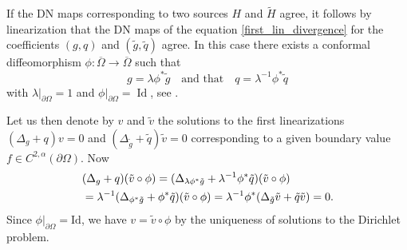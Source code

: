 \documentclass[a4paper, 10pt, twoside, notitlepage]{amsart}
\theoremstyle{plain}
\newcommand{\Om}{\Omega}
\numberwithin{equation}{section}
\newcommand {\p} {\partial}
\newcommand{\ol}[1]{\overline{#1}}
\DeclareMathOperator{\Id} {Id}
\begin{document}
If the DN maps corresponding to two sources $H$ and  $\tilde H$ agree, it follows by linearization that the DN maps of the equation \eqref{first_lin_divergence} for the coefficients $(g,q)$ and $(\tilde g, \tilde q)$ agree. In this case there exists a conformal diffeomorphism $\phi\colon \ol{\Om}\to\ol{\Om}$ such that
\begin{equation}\label{first_lin_determination}
	g=\lambda\phi^*\tilde g\quad \text{and that}\quad q=\lambda^{-1}\phi^*\tilde q
\end{equation}
with $\lambda|_{\p\Om}=1$ and $\phi|_{\p\Om}= \Id$, see \cite{carstea2024calderonproblemriemanniansurfaces}.

Let us then denote by $v$ and $\tilde v$ the solutions to the first linearizations $(\Delta_{g}+q)v=0$ and  $(\Delta_{\tilde g}+\tilde q)\tilde v=0$ corresponding to a given boundary value $f\in C^{2,\alpha}(\p\Omega)$. 
Now 
\begin{align}\label{solutions_linearized}
	&(\Delta_{g} + q)(\tilde{v}\circ\phi) = (\Delta_{\lambda\phi^*\tilde g} + \lambda^{-1}\phi^*\tilde q)(\tilde{v}\circ\phi) \\\notag
	&= \lambda^{-1}(\Delta_{\phi^*\tilde g} + \phi^*\tilde q)(\tilde{v}\circ\phi) = \lambda^{-1}\phi^*(\Delta_{\tilde g}\tilde v + \tilde q\tilde v) = 0.
\end{align}
Since $\phi|_{\p\Om}=\mathrm{Id}$, we have $v=\tilde{v}\circ\phi$ by the uniqueness of solutions to the Dirichlet problem.
\end{document}
